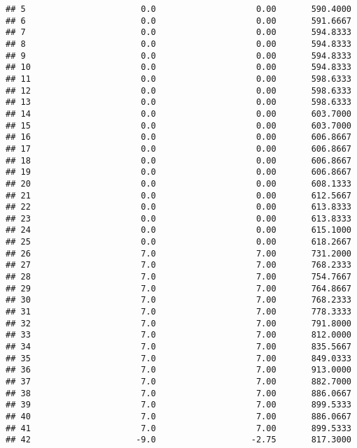 \documentclass[]{article}
\begin{document}
\begin{verbatim}
## 5                       0.0                    0.00       590.4000
## 6                       0.0                    0.00       591.6667
## 7                       0.0                    0.00       594.8333
## 8                       0.0                    0.00       594.8333
## 9                       0.0                    0.00       594.8333
## 10                      0.0                    0.00       594.8333
## 11                      0.0                    0.00       598.6333
## 12                      0.0                    0.00       598.6333
## 13                      0.0                    0.00       598.6333
## 14                      0.0                    0.00       603.7000
## 15                      0.0                    0.00       603.7000
## 16                      0.0                    0.00       606.8667
## 17                      0.0                    0.00       606.8667
## 18                      0.0                    0.00       606.8667
## 19                      0.0                    0.00       606.8667
## 20                      0.0                    0.00       608.1333
## 21                      0.0                    0.00       612.5667
## 22                      0.0                    0.00       613.8333
## 23                      0.0                    0.00       613.8333
## 24                      0.0                    0.00       615.1000
## 25                      0.0                    0.00       618.2667
## 26                      7.0                    7.00       731.2000
## 27                      7.0                    7.00       768.2333
## 28                      7.0                    7.00       754.7667
## 29                      7.0                    7.00       764.8667
## 30                      7.0                    7.00       768.2333
## 31                      7.0                    7.00       778.3333
## 32                      7.0                    7.00       791.8000
## 33                      7.0                    7.00       812.0000
## 34                      7.0                    7.00       835.5667
## 35                      7.0                    7.00       849.0333
## 36                      7.0                    7.00       913.0000
## 37                      7.0                    7.00       882.7000
## 38                      7.0                    7.00       886.0667
## 39                      7.0                    7.00       899.5333
## 40                      7.0                    7.00       886.0667
## 41                      7.0                    7.00       899.5333
## 42                     -9.0                   -2.75       817.3000

\end{verbatim}
\end{document}
